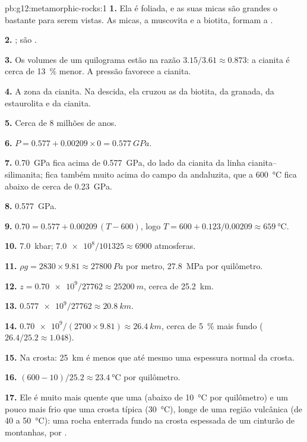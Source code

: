 \begin{solution}{pb:g12:metamorphic-rocks:1}
\textbf{1.} Ela é foliada, e as suas micas são grandes o bastante para
serem vistas. As micas, a muscovita e a biotita, formam a .

\textbf{2.} ; são .

\textbf{3.} Os volumes de um quilograma estão na razão $3.15/3.61 \approx
0.873$: a cianita é cerca de \qty{13}{\percent} menor. A pressão favorece a
cianita.

\textbf{4.} A zona da cianita. Na descida, ela cruzou as  da
biotita, da granada, da estaurolita e da cianita.

\textbf{5.} Cerca de 8 milhões de anos.

\textbf{6.} $P = 0.577 + 0.00209 \times 0 = \qty{0.577}{GPa}$.

\textbf{7.} \qty{0.70}{GPa} fica acima de \qty{0.577}{GPa}, do lado da
cianita da linha cianita--silimanita; fica também muito acima do campo da
andaluzita, que a \qty{600}{\celsius} fica abaixo de cerca de
\qty{0.23}{GPa}.

\textbf{8.} \qty{0.577}{GPa}.

\textbf{9.} $0.70 = 0.577 + 0.00209\,(T - 600)$, logo $T = 600 +
0.123/0.00209 \approx \qty{659}{\celsius}$.

\textbf{10.} \qty{7.0}{kbar}; $\num{7.0e8}/101325 \approx \num{6900}$
atmosferas.

\textbf{11.} $\rho g = 2830 \times 9.81 \approx \qty{27800}{Pa}$ por metro,
\qty{27.8}{MPa} por quilômetro.

\textbf{12.} $z = \num{0.70e9}/\num{27762} \approx \qty{25200}{m}$, cerca de
\qty{25.2}{km}.

\textbf{13.} $\num{0.577e9}/\num{27762} \approx \qty{20.8}{km}$.

\textbf{14.} $\num{0.70e9}/(2700 \times 9.81) \approx \qty{26.4}{km}$, cerca
de \qty{5}{\percent} mais fundo ($26.4/25.2 \approx 1.048$).

\textbf{15.} Na crosta: \qty{25}{km} é menos que até mesmo uma espessura
normal da crosta.

\textbf{16.} $(600 - 10)/25.2 \approx \qty{23.4}{\celsius}$ por quilômetro.

\textbf{17.} Ele é muito mais quente que uma  (abaixo de
\qty{10}{\celsius} por quilômetro) e um pouco mais frio que uma crosta
típica (\qty{30}{\celsius}), longe de uma região vulcânica (de 40 a
\qty{50}{\celsius}): uma rocha enterrada fundo na crosta espessada de um
cinturão de montanhas, por .


\end{solution}
